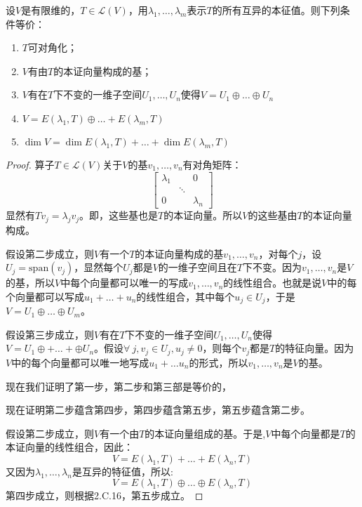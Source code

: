 \documentclass[10pt,a4paper,UTF8]{article}
\begin{document}
\begin{theorem}
设\(V\)是有限维的，\(T\in \mathcal{L}(V)\)，用\(\lambda_{1},\ldots ,\lambda_{m}\)表示\(T\)的所有互异的本征值。则下列条件等价：
\begin{enumerate}
\item \(T\)可对角化；
\item \(V\)有由\(T\)的本证向量构成的基；
\item \(V\)有在\(T\)下不变的一维子空间\(U_{1},\ldots ,U_{n}\)使得\(V = U_{1}\oplus \ldots \oplus U_{n}\)
\item \(V=E(\lambda_{1},T) \oplus \ldots + E(\lambda_{m},T)\)
\item \(\dim V = \dim E(\lambda_{1},T) + \ldots + \dim E(\lambda_{m},T)\)
\end{enumerate}
\end{theorem}

\begin{proof}
算子\(T\in \mathcal{L}(V)\)关于\(V\)的基\(v_{1},\ldots ,v_{n}\)有对角矩阵：
\begin{equation}
\label{eq:8}
\begin{bmatrix}
\lambda_{1} & & 0 \\
&\ddots & \\
0&&\lambda_{n}
\end{bmatrix}
\end{equation}
显然有\(Tv_{j} = \lambda_{j}v_{j}\)。即，这些基也是\(T\)的本证向量。所以\(V\)的这些基由\(T\)的本证向量构成。

假设第二步成立，则\(V\)有一个\(T\)的本证向量构成的基\(v_{1},\ldots ,v_{n}\)，对每个\(j\)，设\(U_{j} = \mathrm{span}(v_{j})\)，显然每个\(U_{j}\)都是\(V\)的一维子空间且在\(T\)下不变。因为\(v_{1},\ldots ,v_{n}\)是\(V\)的基，所以\(V\)中每个向量都可以唯一的写成\(v_{1},\ldots ,v_{n}\)的线性组合。也就是说\(V\)中的每个向量都可以写成\(u_{1}+\ldots +u_{n}\)的线性组合，其中每个\(u_{j}\in U_{j}\)，于是\(V= U_{1}\oplus \ldots \oplus U_{m}\)。

假设第三步成立，则\(V\)有在\(T\)下不变的一维子空间\(U_{1},\ldots ,U_{n}\)使得\(V=U_{1}\oplus + \ldots + \oplus U_{n}\)。假设\(\forall~j,v_{j}\in U_{j},u_{j}\neq 0\)，则每个\(v_{j}\)都是\(T\)的特征向量。因为\(V\)中的每个向量都可以唯一地写成\(u_{1}+ \ldots u_{n}\)的形式，所以\(v_{1},\ldots ,v_{n}\)是\(V\)的基。

现在我们证明了第一步，第二步和第三部是等价的，

现在证明第二步蕴含第四步，第四步蕴含第五步，第五步蕴含第二步。

假设第二步成立，则\(V\)有一个由\(T\)的本证向量组成的基。于是,\(V\)中每个向量都是\(T\)的本证向量的线性组合，因此：
\begin{equation}
\label{eq:9}
V= E(\lambda_{1},T) + \ldots + E(\lambda_{n},T)
\end{equation}
又因为\(\lambda_{1},\ldots ,\lambda_{n}\)是互异的特征值，所以:
\begin{equation}
\label{eq:10}
V= E(\lambda_{1},T) \oplus \ldots \oplus E(\lambda_{n},T)
\end{equation}
第四步成立，则根据2.C.16，第五步成立。
\end{proof}
\end{document}
